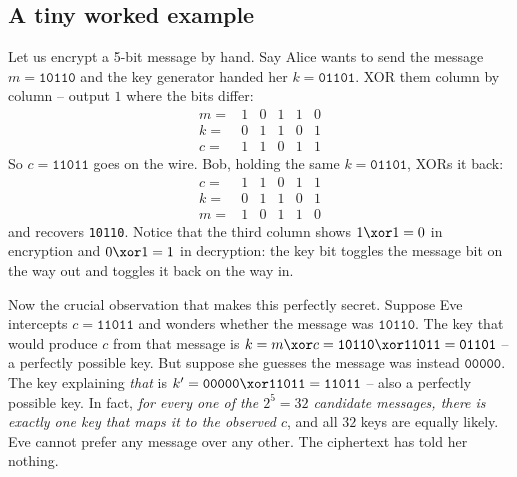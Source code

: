 \begin{center}
\end{center}

\subsection{A tiny worked example}
\label{ch09:tiny}

Let us encrypt a 5-bit message by hand. Say Alice wants to send the message $m = \texttt{10110}$ and the key generator handed her $k = \texttt{01101}$. XOR them column by column -- output $1$ where the bits differ:
\[
\begin{array}{rccccc}
 m  = & 1 & 0 & 1 & 1 & 0 \\
 k  = & 0 & 1 & 1 & 0 & 1 \\ \hline
 c  = & 1 & 1 & 0 & 1 & 1
\end{array}
\]
So $c = \texttt{11011}$ goes on the wire. Bob, holding the same $k = \texttt{01101}$, XORs it back:
\[
\begin{array}{rccccc}
 c  = & 1 & 1 & 0 & 1 & 1 \\
 k  = & 0 & 1 & 1 & 0 & 1 \\ \hline
 m  = & 1 & 0 & 1 & 1 & 0
\end{array}
\]
and recovers \texttt{10110}. Notice that the third column shows $1 \xor 1 = 0$ in encryption and $0 \xor 1 = 1$ in decryption: the key bit toggles the message bit on the way out and toggles it back on the way in.

Now the crucial observation that makes this perfectly secret. Suppose Eve intercepts $c = \texttt{11011}$ and wonders whether the message was $\texttt{10110}$. The key that would produce $c$ from that message is $k = m \xor c = \texttt{10110} \xor \texttt{11011} = \texttt{01101}$ -- a perfectly possible key. But suppose she guesses the message was instead $\texttt{00000}$. The key explaining \emph{that} is $k' = \texttt{00000} \xor \texttt{11011} = \texttt{11011}$ -- also a perfectly possible key. In fact, \emph{for every one of the $2^5 = 32$ candidate messages, there is exactly one key that maps it to the observed $c$}, and all $32$ keys are equally likely. Eve cannot prefer any message over any other. The ciphertext has told her nothing.

